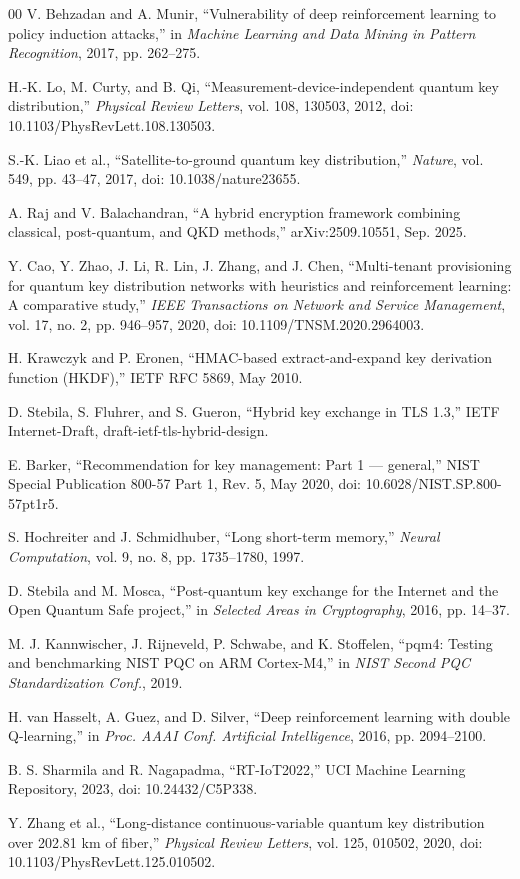 \documentclass[conference]{IEEEtran}
\begin{document}
\begin{thebibliography}{00}
 V. Behzadan and A. Munir, ``Vulnerability of deep reinforcement learning to policy induction attacks,'' in \emph{Machine Learning and Data Mining
in Pattern Recognition}, 2017, pp. 262--275.

 H.-K. Lo, M. Curty, and B. Qi, ``Measurement-device-independent
quantum key distribution,'' \emph{Physical Review Letters}, vol. 108, 130503,
2012, doi: 10.1103/PhysRevLett.108.130503.

 S.-K. Liao et al., ``Satellite-to-ground quantum key distribution,'' \emph{Nature},
vol. 549, pp. 43--47, 2017, doi: 10.1038/nature23655.

 A. Raj and V. Balachandran, ``A hybrid encryption framework combining
classical, post-quantum, and QKD methods,'' arXiv:2509.10551, Sep.
2025.

 Y. Cao, Y. Zhao, J. Li, R. Lin, J. Zhang, and J. Chen, ``Multi-tenant
provisioning for quantum key distribution networks with heuristics and
reinforcement learning: A comparative study,'' \emph{IEEE Transactions on
Network and Service Management}, vol. 17, no. 2, pp. 946--957, 2020,
doi: 10.1109/TNSM.2020.2964003.

 H. Krawczyk and P. Eronen, ``HMAC-based extract-and-expand key
derivation function (HKDF),'' IETF RFC 5869, May 2010.

 D. Stebila, S. Fluhrer, and S. Gueron, ``Hybrid key exchange in TLS
1.3,'' IETF Internet-Draft, draft-ietf-tls-hybrid-design.

 E. Barker, ``Recommendation for key management: Part 1 --- general,''
NIST Special Publication 800-57 Part 1, Rev. 5, May 2020, doi:
10.6028/NIST.SP.800-57pt1r5.

 S. Hochreiter and J. Schmidhuber, ``Long short-term memory,'' \emph{Neural
Computation}, vol. 9, no. 8, pp. 1735--1780, 1997.

 D. Stebila and M. Mosca, ``Post-quantum key exchange for the Internet
and the Open Quantum Safe project,'' in \emph{Selected Areas in Cryptography},
2016, pp. 14--37.

 M. J. Kannwischer, J. Rijneveld, P. Schwabe, and K. Stoffelen, ``pqm4:
Testing and benchmarking NIST PQC on ARM Cortex-M4,'' in \emph{NIST
Second PQC Standardization Conf.}, 2019.

 H. van Hasselt, A. Guez, and D. Silver, ``Deep reinforcement learning
with double Q-learning,'' in \emph{Proc. AAAI Conf. Artificial Intelligence},
2016, pp. 2094--2100.

 B. S. Sharmila and R. Nagapadma, ``RT-IoT2022,'' UCI Machine Learning Repository, 2023, doi: 10.24432/C5P338.

 Y. Zhang et al., ``Long-distance continuous-variable quantum key distribution over 202.81 km of fiber,'' \emph{Physical Review Letters}, vol. 125,
010502, 2020, doi: 10.1103/PhysRevLett.125.010502.

\end{thebibliography}
\end{document}
